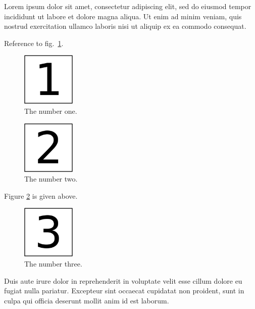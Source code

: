 Lorem ipsum dolor sit amet, consectetur adipiscing elit, sed do eiusmod
tempor incididunt ut labore et dolore magna aliqua. Ut enim ad minim
veniam, quis nostrud exercitation ullamco laboris nisi ut aliquip ex ea
commodo consequat.

Reference to fig.~\ref{fig:1}.

\begin{figure}
\hypertarget{fig:1}{%
\centering
\includegraphics[width=1in,height=\textheight]{img/fig-1.png}
\caption{The number one.}\label{fig:1}
}
\end{figure}

\begin{figure}
\hypertarget{fig:2}{%
\centering
\includegraphics[width=1in,height=\textheight]{img/fig-2.png}
\caption{The number two.}\label{fig:2}
}
\end{figure}

Figure \ref{fig:2} is given above.

\begin{figure}
\hypertarget{fig:}{%
\centering
\includegraphics[width=1in,height=\textheight]{img/fig-3.png}
\caption{The number three.}\label{fig:}
}
\end{figure}

Duis aute irure dolor in reprehenderit in voluptate velit esse cillum
dolore eu fugiat nulla pariatur. Excepteur sint occaecat cupidatat non
proident, sunt in culpa qui officia deserunt mollit anim id est laborum.
